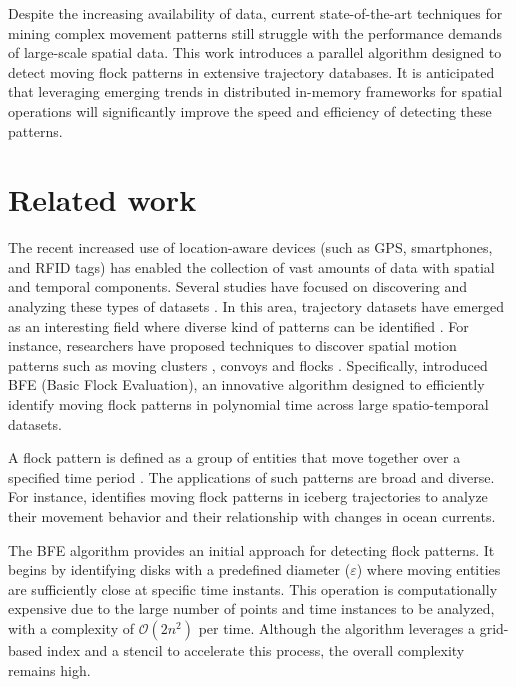 Despite the increasing availability of data, current state-of-the-art techniques for mining complex movement patterns still struggle with the performance demands of large-scale spatial data. This work introduces a parallel algorithm designed to detect moving flock patterns in extensive trajectory databases. It is anticipated that leveraging emerging trends in distributed in-memory frameworks for spatial operations will significantly improve the speed and efficiency of detecting these patterns.

\section{Related work}
The recent increased use of location-aware devices (such as GPS, smartphones, and RFID tags) has enabled the collection of vast amounts of data with spatial and temporal components.  Several studies have focused on discovering and analyzing these types of datasets \cite{leung_knowledge_2010, miller_geographic_2001}.  In this area, trajectory datasets have emerged as an interesting field where diverse kind of patterns can be identified \cite{zheng_computing_2011, vieira_spatio-temporal_2013}.  For instance, researchers have proposed techniques to discover spatial motion patterns such as moving clusters \cite{kalnis_discovering_2005}, convoys \cite{jeung_discovery_2008} and flocks \cite{benkert_reporting_2008, gudmundsson_computing_2006}.  Specifically, \cite{vieira_2009} introduced BFE (Basic Flock Evaluation), an innovative algorithm designed to efficiently identify moving flock patterns in polynomial time across large spatio-temporal datasets.

A flock pattern is defined as a group of entities that move together over a specified time period \cite{benkert_reporting_2008}. The applications of such patterns are broad and diverse. For instance, \cite{calderon_romero_mining_2011} identifies moving flock patterns in iceberg trajectories to analyze their movement behavior and their relationship with changes in ocean currents.

The BFE algorithm provides an initial approach for detecting flock patterns. It begins by identifying disks with a predefined diameter ($\varepsilon$) where moving entities are sufficiently close at specific time instants. This operation is computationally expensive due to the large number of points and time instances to be analyzed, with a complexity of $\mathcal{O}(2n^2)$ per time. Although the algorithm leverages a grid-based index and a stencil to accelerate this process, the overall complexity remains high.

